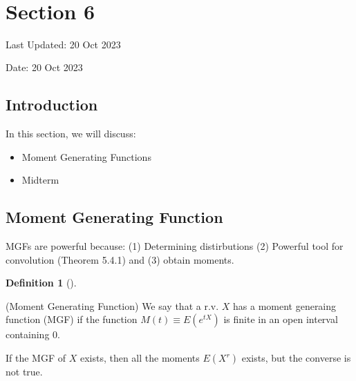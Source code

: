 \documentclass[
  letterpaper,
  DIV=11,
  numbers=noendperiod]{scrreprt}
\providecommand{\tightlist}{%
  \setlength{\itemsep}{0pt}\setlength{\parskip}{0pt}}\usepackage{longtable,booktabs,array}
\theoremstyle{definition}
\newtheorem{definition}{Definition}[chapter]
\theoremstyle{plain}
\theoremstyle{remark}
\begin{document}
\(\,\)


\hypertarget{section-6}{%
\chapter*{Section 6}\label{section-6}}


Last Updated: 20 Oct 2023

Date: 20 Oct 2023

\hypertarget{introduction-5}{%
\section*{Introduction}\label{introduction-5}}


In this section, we will discuss:

\begin{itemize}
\tightlist
\item
  Moment Generating Functions
\item
  Midterm
\end{itemize}

\hypertarget{moment-generating-function}{%
\section*{Moment Generating Function}\label{moment-generating-function}}


MGFs are powerful because: (1) Determining distirbutions (2) Powerful
tool for convolution (Theorem 5.4.1) and (3) obtain moments.

\leavevmode{}%
\begin{definition}[]\label{def-Moment-Generating-Function}

(Moment Generating Function) We say that a r.v. \(\displaystyle X\) has
a moment generaing function (MGF) if the function
\(\displaystyle M( t) \equiv E\left( e^{tX}\right)\) is finite in an
open interval containing 0.

\end{definition}

If the MGF of \(\displaystyle X\) exists, then all the moments
\(\displaystyle E\left( X^{r}\right)\) exists, but the converse is not
true.
\end{document}
